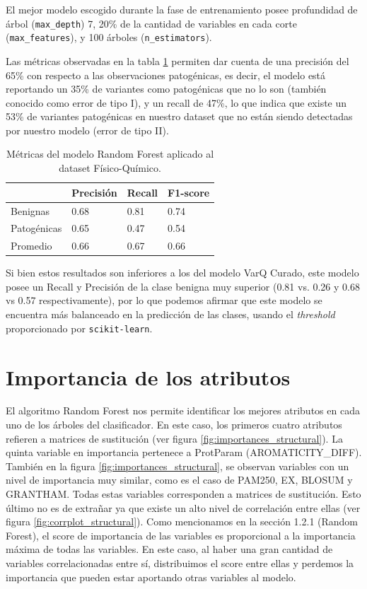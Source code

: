 El mejor modelo escogido durante la fase de entrenamiento posee profundidad de árbol (\texttt{max\_depth}) 7, 20\% de la cantidad de variables en cada corte (\texttt{max\_features}), y 100 árboles (\texttt{n\_estimators}). 

Las métricas observadas en la tabla \ref{structural_table} permiten dar cuenta de una precisión del 65\% con respecto a las observaciones patogénicas, es decir, el modelo está reportando un 35\% de variantes como patogénicas que no lo son (también conocido como error de tipo I), y un recall de 47\%, lo que indica que existe un 53\% de variantes patogénicas en nuestro dataset que no están siendo detectadas por nuestro modelo (error de tipo II). 

\begin{table}[H]
\centering
\begin{tabular}{|l|l|l|l|}
\hline
              & Precisión & Recall & F1-score \\ \hline
Benignas      & 0.68      & 0.81   & 0.74     \\ \hline
Patogénicas   & 0.65      & 0.47   & 0.54     \\ \hline
Promedio      & 0.66      & 0.67   & 0.66     \\ \hline
\end{tabular}
\caption{Métricas del modelo Random Forest aplicado al dataset Físico-Químico.}
\label{structural_table}
\end{table}

Si bien estos resultados son inferiores a los del modelo VarQ Curado, este modelo posee un Recall y Precisión de la clase benigna muy superior (0.81 vs. 0.26 y 0.68 vs 0.57 respectivamente), por lo que podemos afirmar que este modelo se encuentra más balanceado en la predicción de las clases, usando el \textit{threshold} proporcionado por \texttt{scikit-learn}.

\section{Importancia de los atributos}

El algoritmo Random Forest nos permite identificar los mejores atributos en cada uno de los árboles del clasificador. En este caso, los primeros cuatro atributos refieren a matrices de sustitución (ver figura \ref{fig:importances_structural}). La quinta variable en importancia pertenece a ProtParam (AROMATICITY\_DIFF). También en la figura \ref{fig:importances_structural}, se observan variables con un nivel de importancia muy similar, como es el caso de PAM250, EX, BLOSUM y GRANTHAM. Todas estas variables corresponden a matrices de sustitución. Esto último no es de extrañar ya que existe un alto nivel de correlación entre ellas (ver figura \ref{fig:corrplot_structural}). Como mencionamos en la sección 1.2.1 (Random Forest), el score de importancia de las variables es proporcional a la importancia máxima de todas las variables. En este caso, al haber una gran cantidad de variables correlacionadas entre sí, distribuimos el score entre ellas y perdemos la importancia que pueden estar aportando otras variables al modelo. 

